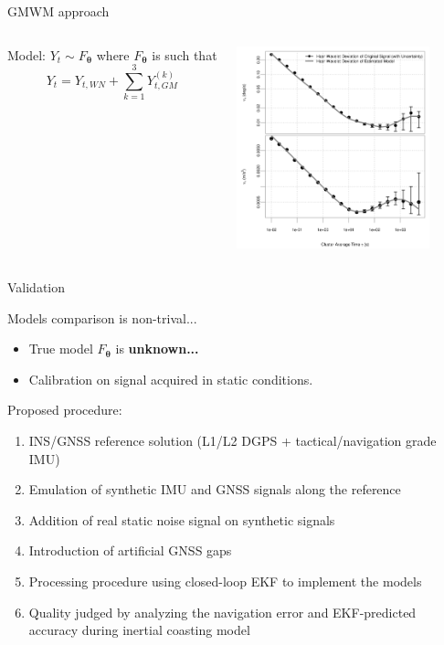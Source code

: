 \documentclass[envcountsect,usenames,dvipsnames]{beamer}
\theoremstyle{mystyle}
\begin{document}
\begin{frame}{GMWM approach}
	
	\begin{columns}[c]
	\column{2in}
	\begin{exampleblock}{Model:}
			$Y_t \sim F_{\bm{\theta}}$ where $F_{\bm{\theta}}$ is such that
			\begin{equation*}
				Y_t = Y_{t,WN} + \sum_{k = 1}^{3} Y_{t,GM}^{(k)}
			\end{equation*}
		\end{exampleblock}
		
	\column{2.2in}
	\vspace{0.4cm}
	\includegraphics[width=2.2in]{Images/mtig_gmwm_sol.png}
	\end{columns}
\end{frame}

\begin{frame}{Validation}
	\begin{block}{Models comparison is non-trival...}
		\begin{itemize}
			\item True model $F_{\bm{\theta}}$ is {\color{beamer@UIUCblue}\textbf{unknown...}}
			\item Calibration on signal acquired in static conditions.
		\end{itemize}
	\end{block}
	\begin{exampleblock}{Proposed procedure:}
		\begin{enumerate}
			\item INS/GNSS reference solution (L1/L2 DGPS + tactical/navigation grade IMU)
			\item Emulation of synthetic IMU and GNSS signals along the reference
			\item Addition of real static noise signal on synthetic signals
			\item Introduction of artificial GNSS gaps
			\item Processing procedure using closed-loop EKF to implement the models
			\item Quality judged by analyzing the navigation error and EKF-predicted accuracy during inertial coasting model
		\end{enumerate}
	\end{exampleblock}
\end{frame}
\end{document}
